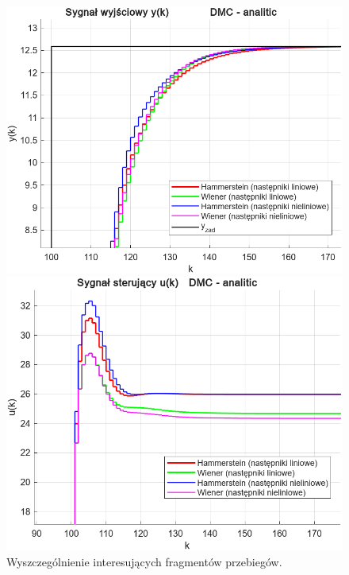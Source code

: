 \documentclass[a4paper,titlepage,11pt,floatssmall]{mwrep}
\begin{document}
\begin{figure}[p]
\begin{minipage}{0.495\linewidth}
    \centering
    \includegraphics[width=\linewidth]{pictures/DMC_analitic_y_zoom}
\end{minipage}
\hfill
\begin{minipage}{0.495\linewidth}
    \centering
    \includegraphics[width=\linewidth]{pictures/DMC_analitic_u_zoom}
\end{minipage}
\caption{Wyszczególnienie interesujących fragmentów przebiegów.}
\end{figure}

\end{document}
